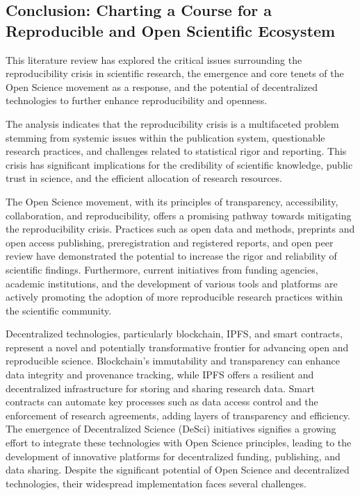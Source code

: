 \subsection{Conclusion: Charting a Course for a Reproducible and Open Scientific Ecosystem}

This literature review has explored the critical issues surrounding the reproducibility crisis in scientific research, the emergence and core tenets of the Open Science movement as a response, and the potential of decentralized technologies to further enhance reproducibility and openness.

The analysis indicates that the reproducibility crisis is a multifaceted problem stemming from systemic issues within the publication system, questionable research practices, and challenges related to statistical rigor and reporting. This crisis has significant implications for the credibility of scientific knowledge, public trust in science, and the efficient allocation of research resources.

The Open Science movement, with its principles of transparency, accessibility, collaboration, and reproducibility, offers a promising pathway towards mitigating the reproducibility crisis. Practices such as open data and methods, preprints and open access publishing, preregistration and registered reports, and open peer review have demonstrated the potential to increase the rigor and reliability of scientific findings. Furthermore, current initiatives from funding agencies, academic institutions, and the development of various tools and platforms are actively promoting the adoption of more reproducible research practices within the scientific community.

Decentralized technologies, particularly blockchain, IPFS, and smart contracts, represent a novel and potentially transformative frontier for advancing open and reproducible science. Blockchain's immutability and transparency can enhance data integrity and provenance tracking, while IPFS offers a resilient and decentralized infrastructure for storing and sharing research data. Smart contracts can automate key processes such as data access control and the enforcement of research agreements, adding layers of transparency and efficiency. The emergence of Decentralized Science (DeSci) initiatives signifies a growing effort to integrate these technologies with Open Science principles, leading to the development of innovative platforms for decentralized funding, publishing, and data sharing. Despite the significant potential of Open Science and decentralized technologies, their widespread implementation faces several challenges.

